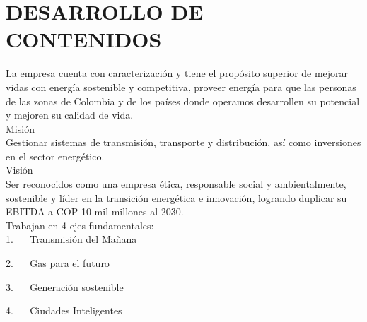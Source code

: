 \section {DESARROLLO DE CONTENIDOS}La empresa cuenta con caracterización y tiene el propósito superior de mejorar vidas con energía sostenible y competitiva, proveer energía para que las personas de las zonas de Colombia y de los países donde operamos desarrollen su potencial y mejoren su calidad de vida. 
\\

Misión\\ 
Gestionar sistemas de transmisión, transporte y distribución, así como inversiones en el sector energético.
\\

Visión\\ 
Ser reconocidos como una empresa ética, responsable social y ambientalmente, sostenible y líder en la transición energética e innovación, logrando duplicar su EBITDA a COP 10 mil millones al 2030.
\\

Trabajan en 4 ejes fundamentales:\\

1.    Transmisión del Mañana

2.    Gas para el futuro

3.    Generación sostenible

4.    Ciudades Inteligentes
\label{sec:Background}

